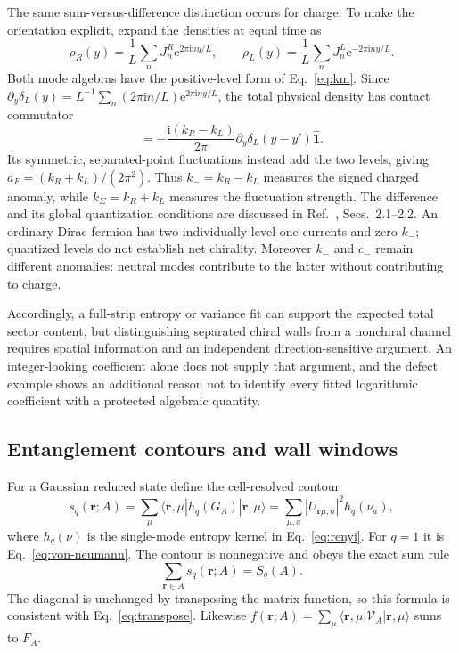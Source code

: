 \documentclass[aps,prb,onecolumn,nofootinbib,superscriptaddress]{revtex4-2}
\newcommand{\One}{\hat{\mathbf{1}}}
\newcommand{\ii}{\mathrm{i}}
\newcommand{\e}{\mathrm{e}}
\begin{document}
The same sum-versus-difference distinction occurs for charge. To make
the orientation explicit, expand the densities at equal time as
\begin{equation}
 \rho_R(y)=\frac1L\sum_nJ_n^R\e^{2\pi\ii ny/L},\qquad
 \rho_L(y)=\frac1L\sum_nJ_n^L\e^{-2\pi\ii ny/L}.
 \label{eq:oriented-current-modes}
\end{equation}
Both mode algebras have the positive-level form of Eq.~\eqref{eq:km}.
Since $\partial_y\delta_L(y)=
L^{-1}\sum_n(2\pi\ii n/L)\e^{2\pi\ii ny/L}$, the total physical
density has contact commutator
\begin{equation}
 [\rho_R(y)+\rho_L(y),\rho_R(y')+\rho_L(y')]
 =-\frac{\ii(k_R-k_L)}{2\pi}
                  \partial_y\delta_L(y-y')\One .
 \label{eq:charge-anomaly-bracket}
\end{equation}
Its symmetric, separated-point fluctuations instead add the two levels,
giving $a_F=(k_R+k_L)/(2\pi^2)$. Thus $k_-=k_R-k_L$ measures the
signed charged anomaly, while $k_\Sigma=k_R+k_L$ measures the
fluctuation strength. The difference and its global quantization
conditions are discussed in Ref.~\cite{BenjaminOoguriShaoWang2020},
Secs.~2.1--2.2. An ordinary Dirac fermion has two individually
level-one currents and zero $k_-$; quantized levels do not establish
net chirality. Moreover $k_-$ and $c_-$ remain different anomalies:
neutral modes contribute to the latter without contributing to charge.

Accordingly, a full-strip entropy or variance fit can support the
expected total sector content, but distinguishing separated chiral walls
from a nonchiral channel requires spatial information and an independent
direction-sensitive argument. An integer-looking coefficient alone
does not supply that argument, and the defect example shows an additional
reason not to identify every fitted logarithmic coefficient with a
protected algebraic quantity.

\subsection{Entanglement contours and wall windows}
For a Gaussian reduced state define the cell-resolved contour
\cite{ChenVidal2014}
\begin{equation}
 s_q(\boldsymbol r;A)=
 \sum_\mu\langle\boldsymbol r,\mu|
 h_q(G_A)|\boldsymbol r,\mu\rangle
 =\sum_{\mu,a}|U_{\boldsymbol r\mu,a}|^2h_q(\nu_a),
 \label{eq:contour}
\end{equation}
where $h_q(\nu)$ is the single-mode entropy kernel in
Eq.~\eqref{eq:renyi}. For $q=1$ it is Eq.~\eqref{eq:von-neumann}.
The contour is nonnegative and obeys the exact sum rule
\begin{equation}
 \sum_{\boldsymbol r\in A}s_q(\boldsymbol r;A)=S_q(A).
 \label{eq:contour-sum}
\end{equation}
The diagonal is unchanged by transposing the matrix function, so this
formula is consistent with Eq.~\eqref{eq:transpose}.
Likewise $f(\boldsymbol r;A)=
\sum_\mu\langle\boldsymbol r,\mu|\mathcal V_A|\boldsymbol r,\mu\rangle$
sums to $F_A$.
\end{document}
